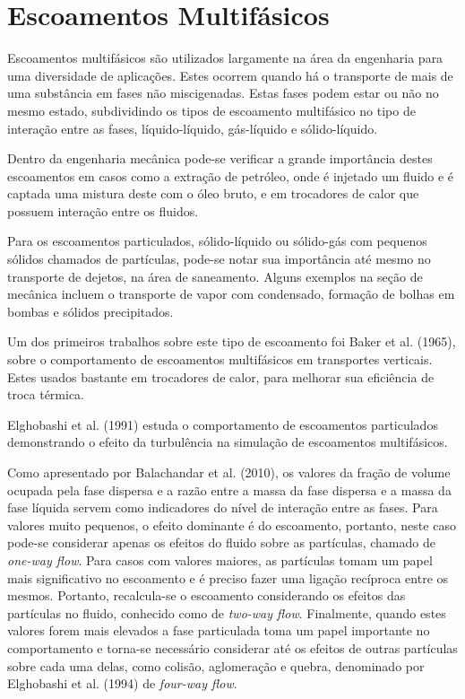 \section{\textbf{Escoamentos Multifásicos}}
\label{sec_rev_MF}
Escoamentos multifásicos são utilizados largamente na área da engenharia para uma diversidade de aplicações.
Estes ocorrem quando há o transporte de mais de uma substância em fases não miscigenadas.
Estas fases podem estar ou não no mesmo estado, subdividindo os tipos de escoamento multifásico no tipo de interação entre as fases, líquido-líquido, gás-líquido e sólido-líquido.

Dentro da engenharia mecânica pode-se verificar a grande importância destes escoamentos em casos como a extração de petróleo, onde é injetado um fluido e é captada uma mistura deste com o óleo bruto, e em trocadores de calor que possuem interação entre os fluidos.

Para os escoamentos particulados, sólido-líquido ou sólido-gás com pequenos sólidos chamados de partículas, pode-se notar sua importância até mesmo no transporte de dejetos, na área de saneamento.%
Alguns exemplos na seção de mecânica incluem o transporte de vapor com condensado, formação de bolhas em bombas e sólidos precipitados.

Um dos primeiros trabalhos sobre este tipo de escoamento foi Baker et al. (1965)\cite{Baker-1965}, sobre o comportamento de escoamentos multifásicos em transportes verticais.
Estes usados bastante em trocadores de calor, para melhorar sua eficiência de troca térmica.

Elghobashi et al. (1991)\cite{Elghobashi-1991} estuda o comportamento de escoamentos particulados demonstrando o efeito da turbulência na simulação de escoamentos multifásicos.

Como apresentado por Balachandar et al. (2010)\cite{Balachandar-2010}, os valores da fração de volume ocupada pela fase dispersa e a razão entre a massa da fase dispersa e a massa da fase líquida servem como indicadores do nível de interação entre as fases.
Para valores muito pequenos, o efeito dominante é do escoamento, portanto, neste caso pode-se considerar apenas os efeitos do fluido sobre as partículas, chamado de \textit{one-way flow}.
Para casos com valores maiores, as partículas tomam um papel mais significativo no escoamento e é preciso fazer uma ligação recíproca entre os mesmos.
Portanto, recalcula-se o escoamento considerando os efeitos das partículas no fluido, conhecido como de \textit{two-way flow}.
Finalmente, quando estes valores forem mais elevados a fase particulada toma um papel importante no comportamento e torna-se necessário considerar até os efeitos de outras partículas sobre cada uma delas, como colisão, aglomeração e quebra, denominado por Elghobashi et al. (1994)\cite{Elghobashi-1994} de \textit{four-way flow}.

